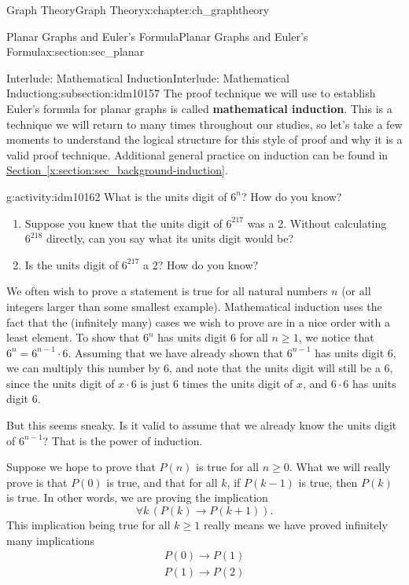 \documentclass[oneside,10pt,]{book}
\newcommand{\terminology}[1]{\textbf{#1}}
\numberwithin{equation}{chapter}
\def\imp{\rightarrow}
\begin{document}
\begin{chapterptx}{Graph Theory}{}{Graph Theory}{}{}{x:chapter:ch_graphtheory}
\begin{sectionptx}{Planar Graphs and Euler's Formula}{}{Planar Graphs and Euler's Formula}{}{}{x:section:sec_planar}
\begin{subsectionptx}{Interlude: Mathematical Induction}{}{Interlude: Mathematical Induction}{}{}{g:subsection:idm10157}
The proof technique we will use to establish Euler's formula for planar graphs is called \terminology{mathematical induction}.  This is a technique we will return to many times throughout our studies, so let's take a few moments to understand the logical structure for this style of proof and why it is a valid proof technique.  Additional general practice on induction can be found in \hyperref[x:section:sec_background-induction]{Section~\ref{x:section:sec_background-induction}}.%
\begin{activity}{}{g:activity:idm10162}%
What is the units digit of \(6^n\)?  How do you know?%
\begin{enumerate}[font=\bfseries,label=(\alph*),ref=\alph*]
\item{}Suppose you knew that the units digit of \(6^{217}\) was a 2.  Without calculating \(6^{218}\) directly, can you say what its units digit would be?%
\item{}Is the units digit of \(6^{217}\) a 2?  How do you know?%
\end{enumerate}
\end{activity}
We often wish to prove a statement is true for all natural numbers \(n\) (or all integers larger than some smallest example).  Mathematical induction uses the fact that the (infinitely many) cases we wish to prove are in a nice order with a least element.  To show that \(6^n\) has units digit 6 for all \(n \ge 1\), we notice that \(6^n = 6^{n-1}\cdot 6\).  Assuming that we have already shown that \(6^{n-1}\) has units digit 6, we can multiply this number by 6, and note that the units digit will still be a 6, since the units digit of \(x \cdot 6\) is just 6 times the units digit of \(x\), and \(6\cdot 6\) has units digit 6.%
\par
But this seems sneaky.  Is it valid to assume that we already know the units digit of \(6^{n-1}\)?  That is the power of induction.%
\par
Suppose we hope to prove that \(P(n)\) is true for all \(n \ge 0\).  What we will really prove is that \(P(0)\) is true, and that for all \(k\), if \(P(k-1)\) is true, then \(P(k)\) is true.  In other words, we are proving the implication%
\begin{equation*}
\forall k \,(P(k) \imp P(k+1)).
\end{equation*}
This implication being true for all \(k \ge 1\) really means we have proved infinitely many implications%
\begin{gather*}
P(0) \imp P(1)\\
P(1) \imp P(2)\\

\end{gather*}
\end{subsectionptx}
\end{sectionptx}
\end{chapterptx}
\end{document}
